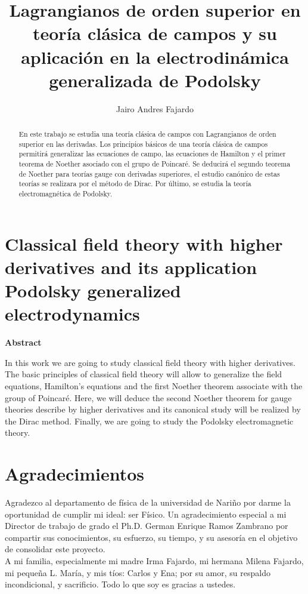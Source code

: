 \documentclass[a4paper,12pt]{article}
\title{Lagrangianos de orden superior en teoría clásica de campos y su aplicación en la electrodinámica generalizada de Podolsky}
\author{Jairo Andres Fajardo}
\date{}
\begin{document}
\maketitle
\begin{abstract}
\noindent En este trabajo se estudia una teoría clásica de campos con Lagrangianos de orden superior en las derivadas. Los principios básicos de una teoría clásica de campos permitirá generalizar las ecuaciones de campo, las ecuaciones de Hamilton y el primer teorema de Noether asociado con el grupo de Poincaré. Se deducirá el segundo teorema de Noether para teorías gauge con derivadas superiores, el estudio canónico de estas teorías se realizara por el método de Dirac. Por último, se estudia la teoría electromagnética de Podolsky.
\end{abstract}
\newpage
\section{Classical field theory with higher \mbox{derivatives} and its application Podolsky generalized \mbox{electrodynamics}}
\begin{center}
\textbf{Abstract }
\end{center}
In this work we are going to study classical field theory with higher derivatives. The basic principles of classical field theory will allow to generalize the field equations, Hamilton's equations and the first Noether theorem associate with the group of Poincaré. Here, we will deduce the second Noether theorem for gauge theories describe by higher derivatives and its canonical study will be realized by the Dirac method. Finally, we are going to study the Podolsky electromagnetic theory.
\newpage
\section{Agradecimientos}
Agradezco al departamento de física de la universidad de Nariño por darme la oportunidad de cumplir mi ideal: ser Físico. Un agradecimiento especial a mi Director de trabajo de grado el Ph.D. German Enrique Ramos Zambrano por compartir sus conocimientos, su esfuerzo, su tiempo, y su asesoría en el objetivo de consolidar este proyecto.
\\

A mi familia, especialmente mi madre Irma Fajardo, mi hermana Milena Fajardo, mi pequeña L. María, y mis tíos: Carlos y Ena; por su amor, su respaldo incondicional, y sacrificio. Todo lo que soy es gracias a ustedes. 
\\
\end{document}
